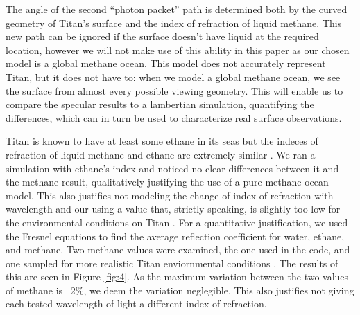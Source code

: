 \documentclass[twocolumn,linenumbers]{aastex631}
\begin{document}
The angle of the second ``photon packet'' path is determined both by the curved geometry of Titan's surface and the index of refraction of liquid methane. This new path can be ignored if the surface doesn't have liquid at the required location, however we will not make use of this ability in this paper as our chosen model is a global methane ocean. This model does not accurately represent Titan, but it does not have to: when we model a global methane ocean, we see the surface from almost every possible viewing geometry. This will enable us to compare the specular results to a lambertian simulation, quantifying the differences, which can in turn be used to characterize real surface observations. 

Titan is known to have at least some ethane in its seas \citep{Mastrogiuseppe2016} but the indeces of refraction of liquid methane and ethane are extremely similar \citep{Kanjanasakul2020}. We ran a simulation with ethane's index and noticed no clear differences between it and the methane result, qualitatively justifying the use of a pure methane ocean model. This also justifies not modeling the change of index of refraction with wavelength and our using a value that, strictly speaking, is slightly too low for the environmental conditions on Titan \citep{Martonchik1994, Jennings2019}. For a quantitative justification, we used the Fresnel equations to find the average reflection coefficient for water, ethane, and methane. Two methane values were examined, the one used in the code, and one sampled for more realistic Titan enviornmental conditions \citep{Martonchik1994}. The results of this are seen in Figure \ref{fig:4}. As the maximum variation between the two values of methane is ~2\%, we deem the variation neglegible. This also justifies not giving each tested wavelength of light a different index of refraction.
\end{document}
